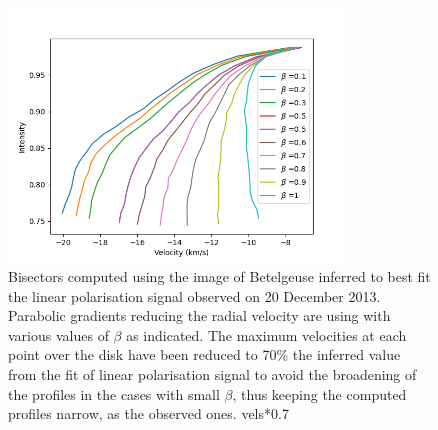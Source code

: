 \documentclass{/Users/art2/TeX/aanda/aa}
\begin{document}
\begin{figure}
   \includegraphics[width=0.8\textwidth]{Fig9_art74.png}

   \caption{Bisectors computed using the image of Betelgeuse inferred to best fit the linear polarisation signal observed on 20 December 2013. Parabolic 
   gradients reducing the radial velocity are using with various values of $\beta$ as indicated. The maximum velocities at each point over the disk
   have been reduced to 70\%  the inferred value from the fit of linear polarisation signal to avoid the broadening of the profiles in the cases with 
   small $\beta$, thus keeping the computed profiles narrow, as the observed ones. 
    vels*0.7}
   \label{bisector1}
   \end{figure}
\end{document}

